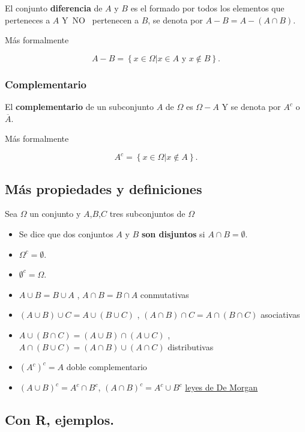 \documentclass[]{book}
\providecommand{\tightlist}{%
  \setlength{\itemsep}{0pt}\setlength{\parskip}{0pt}}
\begin{document}
El conjunto \textbf{diferencia} de \(A\) y \(B\) es el formado por todos los elementos que perteneces a \(A\) \mbox{Y NO } pertenecen a \(B\), se denota por \(A-B=A-(A\cap B)\).

Más formalmente

\[
A- B=\left\{x\in\Omega \big| x\in A \mbox{ y } x\notin B\right\}.
\]

\hypertarget{complementario}{%
\subsubsection{Complementario}\label{complementario}}

El \textbf{complementario} de un subconjunto \(A\) de \(\Omega\) es \(\Omega-A\) Y se denota por \(A^c\) o \(\overline{A}\).

Más formalmente

\[
A^c=\left\{x\in\Omega \big| x\not\in A\right\}.
\]

\hypertarget{muxe1s-propiedades-y-definiciones}{%
\subsection{Más propiedades y definiciones}\label{muxe1s-propiedades-y-definiciones}}

Sea \(\Omega\) un conjunto y \(A\),\(B\),\(C\) tres subconjuntos de \(\Omega\)

\begin{itemize}
\tightlist
\item
  Se dice que dos conjuntos \(A\) y \(B\) \textbf{son disjuntos} si \(A\cap B=\emptyset.\)
\item
  \(\Omega^c=\emptyset\).
\item
  \(\emptyset^c=\Omega\).
\item
  \(A\cup B=B \cup A\) , \(A\cap B=B\cap A\) conmutativas
\item
  \((A\cup B) \cup C = A \cup( B \cup C)\) , \((A\cap B) \cap C = A \cap( B \cap C)\) asociativas
\item
  \(A\cup (B\cap C)=(A\cup B) \cap (A\cup C)\) , \(A\cap (B\cup C)=(A\cap B) \cup (A\cap C)\) distributivas
\item
  \(\left(A^c\right)^c=A\) doble complementario
\item
  \(\left(A\cup B\right)^c=A^c \cap B^c\), \(\left(A\cap B\right)^c=A^c \cup B^c\) \href{https://es.wikipedia.org/wiki/Leyes_de_De_Morgan}{leyes de De Morgan}
\end{itemize}

\hypertarget{con-r-ejemplos.}{%
\subsection{Con R, ejemplos.}\label{con-r-ejemplos.}}
\end{document}
